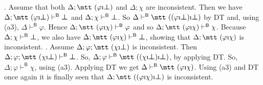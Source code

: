 \proofbeg 
{}. Assume that both $\Delta;\mbox{\mtt ($\varphi$\symbol{25}%
$\sbot$)}$ and $\Delta;\chi$ are inconsistent. Then we have $\Delta;\mbox{\mtt
($\varphi$\symbol{25}$\sbot$)} \vdash^{\mathsf{B}} \sbot$ and
$\Delta;\chi\vdash^{\mathsf{B}} \boldsymbol{\bot}$. So
$\Delta\vdash^{\mathsf{B}} \mbox{\mtt (($\varphi$\symbol{25}%
$\sbot$)\symbol{25}$\sbot$)}$ by DT and, using (a3), 
$\Delta\vdash^{\mathsf{B}} \varphi$. Hence $\Delta;\mbox{\mtt %
($\varphi$\symbol{25}$\chi$)}%
\vdash^{\mathsf{B}} \varphi$ and so $\Delta;\mbox{\mtt
($\varphi$\symbol{25}$\chi$)} \vdash^{\mathsf{B}} \chi$. Because
$\Delta;\chi\vdash^{\mathsf{B}} \boldsymbol{\bot}$, we also have
$\Delta;\mbox{\mtt ($\varphi$\symbol{25}$\chi$)}\vdash^{\mathsf{B}}
\sbot$, showing that $\Delta;\mbox{\mtt ($\varphi$\symbol{25}$\chi$)}$ 
is inconsistent. . Assume $\Delta;\varphi;\mbox{\mtt ($\chi$%
\symbol{25}$\sbot$)}$ is inconsistent. Then 
$\Delta;\varphi;\mbox{\mtt ($\chi$\symbol{25}%
$\sbot$)}\vdash^{\mathsf{B}} \sbot$. So,
$\Delta;\varphi\vdash^{\mathsf{B}} \mbox{\mtt
(($\chi$\symbol{25}$\sbot$)\symbol{25}$\sbot$)}$, by applying DT.
So, $\Delta;\varphi\vdash^{\mathsf{B}}\chi$, using (a3). Applying
DT we get $\Delta \vdash^{\mathsf{B}} \mbox{\mtt
($\varphi$\symbol{25}$\chi$)}$. Using (a3) and DT once again it is
finally seen that $\Delta;\mbox{\mtt (($\varphi$\symbol{25}$\chi$%
)\symbol{25}$\sbot$)}$ is inconsistent. 
\proofend

